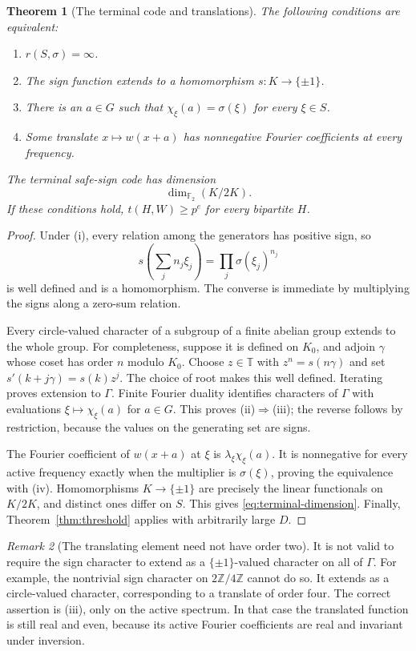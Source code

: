 \documentclass[11pt]{article}
\numberwithin{equation}{section}
\newtheorem{theorem}{Theorem}[section]
\theoremstyle{definition}
\theoremstyle{remark}
\newtheorem{remark}[theorem]{Remark}
\newcommand{\F}{\mathbb F}
\newcommand{\Z}{\mathbb Z}
\newcommand{\T}{\mathbb T}
\begin{document}
\begin{theorem}[The terminal code and translations]
\label{thm:global}
The following conditions are equivalent:
\begin{enumerate}[label=(\roman*)]
 \item $r(S,\sigma)=\infty$.
 \item The sign function extends to a homomorphism $s:K\to\{\pm1\}$.
 \item There is an $a\in G$ such that
       $\chi_\xi(a)=\sigma(\xi)$ for every $\xi\in S$.
 \item Some translate $x\mapsto w(x+a)$ has nonnegative Fourier
       coefficients at every frequency.
\end{enumerate}
The terminal safe-sign code has dimension
\begin{equation}
 \dim_{\F_2}(K/2K).
 \label{eq:terminal-dimension}
\end{equation}
If these conditions hold, $t(H,W)\geq p^e$ for every bipartite $H$.
\end{theorem}
\begin{proof}
Under (i), every relation among the generators has positive sign, so
\[
 s\left(\sum_j n_j\xi_j\right)=\prod_j\sigma(\xi_j)^{n_j}
\]
is well defined and is a homomorphism. The converse is immediate by
multiplying the signs along a zero-sum relation.

Every circle-valued character of a subgroup of a finite abelian group
extends to the whole group. For completeness, suppose it is defined on
$K_0$, and adjoin $\gamma$ whose coset has order $n$ modulo $K_0$.
Choose $z\in\T$ with $z^n=s(n\gamma)$ and set
$s'(k+j\gamma)=s(k)z^j$. The choice of root makes this well defined.
Iterating proves extension to $\Gamma$. Finite Fourier duality identifies
characters of $\Gamma$ with evaluations $\xi\mapsto\chi_\xi(a)$ for
$a\in G$. This proves (ii)$\Rightarrow$(iii); the reverse follows by
restriction, because the values on the generating set are signs.

The Fourier coefficient of $w(x+a)$ at $\xi$ is
$\lambda_\xi\chi_\xi(a)$. It is nonnegative for every active frequency
exactly when the multiplier is $\sigma(\xi)$, proving the equivalence
with (iv). Homomorphisms $K\to\{\pm1\}$ are precisely the linear
functionals on $K/2K$, and distinct ones differ on $S$. This gives
\eqref{eq:terminal-dimension}. Finally, Theorem~\ref{thm:threshold}
applies with arbitrarily large $D$.
\end{proof}

\begin{remark}[The translating element need not have order two]
It is not valid to require the sign character to extend as a
$\{\pm1\}$-valued character on all of $\Gamma$. For example, the
nontrivial sign character on $2\Z/4\Z$ cannot do so. It extends as a
circle-valued character, corresponding to a translate of order four.
The correct assertion is (iii), only on the active spectrum. In that
case the translated function is still real and even, because its active
Fourier coefficients are real and invariant under inversion.
\end{remark}
\end{document}
